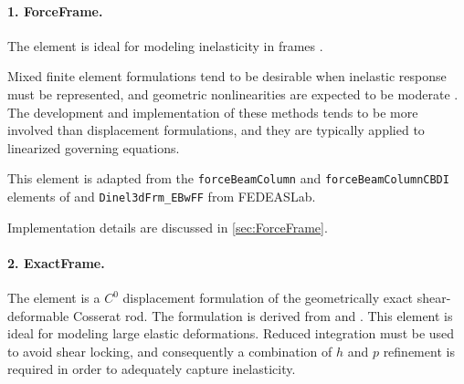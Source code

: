 \paragraph{1. ForceFrame.}
The \ForceFrame{} element is ideal for modeling inelasticity in
frames \citep{neuenhofer1997evaluation}. 
  
Mixed finite element formulations tend to be desirable when inelastic response must be represented, and geometric nonlinearities are expected to be moderate \citep{neuenhofer1997evaluation}. 
The development and implementation of these methods tends to be more involved than displacement formulations, and they are typically applied to linearized governing equations. 

This element is adapted from the \texttt{forceBeamColumn} and
\texttt{forceBeamColumnCBDI} elements of \OpenSees{} and
\texttt{Dinel3dFrm\_EBwFF} from FEDEASLab. 

Implementation details are discussed in \cref{sec:ForceFrame}.


\paragraph{2. ExactFrame.}
The \ExactFrame{} element is a \(C^0\) displacement formulation of
the geometrically exact shear-deformable Cosserat rod. 
The formulation is derived from \cite{simo1986threedimensional} and \cite{perez2024nonlinear}. 
This element is ideal for modeling large elastic deformations. 
Reduced integration must be
used to avoid shear locking, and consequently a combination of \(h\)
and \(p\) refinement is required in order to adequately capture
inelasticity. 

